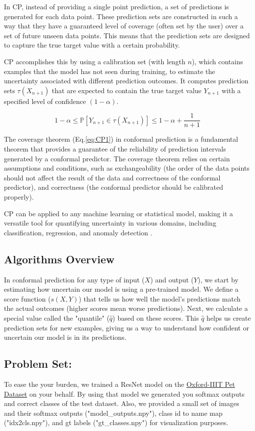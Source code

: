 \documentclass[11pt, oneside]{article}   	%
\begin{document}
In CP, instead of providing a single point prediction, a set of predictions is generated for each data point. These prediction sets are constructed in such a way that they have a guaranteed level of coverage (often set by the user) over a set of future unseen data points. This means that the prediction sets are designed to capture the true target value with a certain probability.

CP accomplishes this by using a calibration set (with length $n$), which contains examples that the model has not seen during training, to estimate the uncertainty associated with different prediction outcomes. It computes prediction sets $\tau(X_{n+1})$ that are expected to contain the true target value $Y_{n+1}$ with a specified level of confidence $(1-\alpha)$.

\begin{equation}\label{eq:CP1}
1-\alpha \leq \mathbb{P}\left [ Y_{n+1}\in \tau (X_{n+1}) \right ]\leq  1-\alpha+\frac{1}{n+1}
\end{equation}

The coverage theorem (Eq.\ref{eq:CP1}) in conformal prediction is a fundamental theorem that provides a guarantee of the reliability of prediction intervals generated by a conformal predictor. The coverage theorem relies on certain assumptions and conditions, such as exchangeability (the order of the data points should not affect the result of the data and correctness of the conformal predictor), and correctness (the conformal predictor should be calibrated properly).

CP can be applied to any machine learning or statistical model, making it a versatile tool for quantifying uncertainty in various domains, including classification, regression, and anomaly detection
.
\subsection*{Algorithms Overview}
In conformal prediction for any type of input ($X$) and output ($Y$), we start by estimating how uncertain our model is using a pre-trained model. We define a score function ($s(X,Y)$) that tells us how well the model's predictions match the actual outcomes (higher scores mean worse predictions). Next, we calculate a special value called the "quantile" ($\hat{q}$) based on these scores. This $\hat{q}$ helps us create prediction sets for new examples, giving us a way to understand how confident or uncertain our model is in its predictions.

\subsection*{Problem Set:}
To ease the your burden, we trained a ResNet model on the \href{https://www.kaggle.com/datasets/tanlikesmath/the-oxfordiiit-pet-dataset?select=images}{Oxford-IIIT Pet Dataset} on your behalf. By using that model we generated you softmax outputs and correct classes of the test dataset. Also, we provided a small set of images and their softmax outputs ("model\_outputs.npy"), class id to name map ("idx2cls.npy"), and gt labels  ("gt\_classes.npy") for visualization purposes. 
\end{document}
